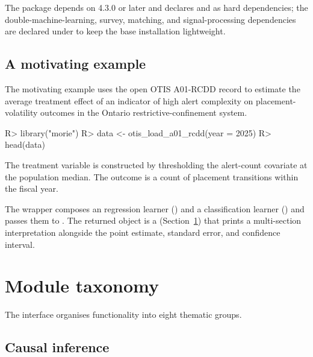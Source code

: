 \documentclass[article,shortnames,nojss]{jss}
\newcommand{\OTIS}{\textsf{OTIS}}
\begin{document}
\noindent The package depends on  4.3.0 or later and
declares  and  as hard dependencies; the
double-machine-learning, survey, matching, and signal-processing
dependencies are declared under  to keep the base
installation lightweight.

\subsection{A motivating example}

The motivating example uses the open \OTIS{} A01-RCDD record to
estimate the average treatment effect of an indicator of high
alert complexity on placement-volatility outcomes in the Ontario
restrictive-confinement system.

\begin{Code}
R> library("morie")
R> data <- otis_load_a01_rcdd(year = 2025)
R> head(data)
\end{Code}

\noindent The treatment variable is constructed by thresholding
the alert-count covariate at the population median. The outcome
is a count of placement transitions within the fiscal year.


\noindent The  wrapper composes an
 regression learner () and a
classification learner () and passes
them to . The returned object is a
 (Section~\ref{sec:taxonomy}) that prints a
multi-section interpretation alongside the point estimate, standard
error, and confidence interval.

\section{Module taxonomy}
\label{sec:taxonomy}

The   interface organises functionality
into eight thematic groups.

\subsection{Causal inference}
\end{document}
